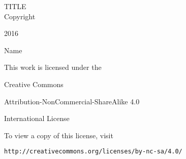 \vspace*{\fill}

TITLE \\

\textcopyright \hspace{10pt} Copyright 

2016 

Name

This work is licensed under the 

Creative Commons 

Attribution-NonCommercial-ShareAlike 4.0

 International License 

To view a copy of this license, visit

{\tt http://creativecommons.org/licenses/by-nc-sa/4.0/}
\thispagestyle{empty}